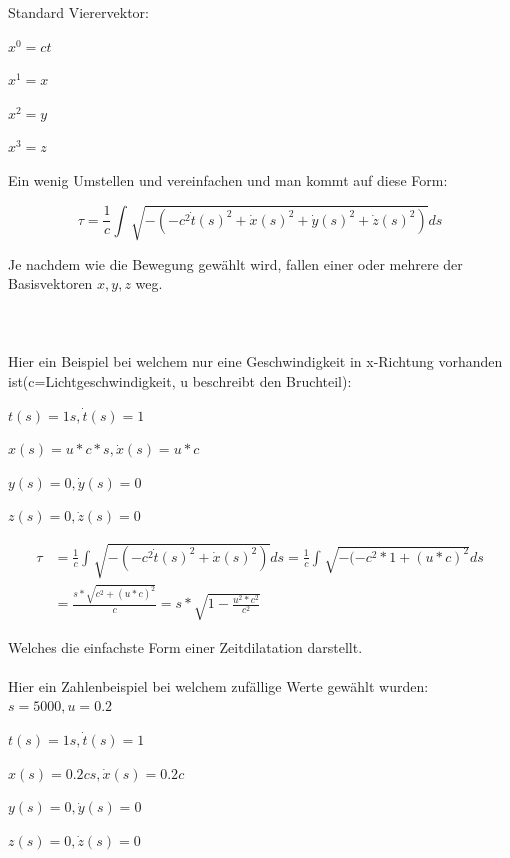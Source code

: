 \begin{refsection}
Standard Vierervektor:

\begin{list}{}{}
    \item \(x^{0}=ct\)
    \item \(x^{1}=x\)
    \item \(x^{2}=y\)
    \item \(x^{3}=z\)
\end{list}

Ein wenig Umstellen und vereinfachen und man kommt auf diese Form:

\begin{equation}
    \tau
    =
    \frac{1}{c}\int_{}^{}\sqrt{-(-c^2\dot{t}(s)^{2}+\dot{x}(s)^{2}+\dot{y}(s)^{2}+\dot{z}(s)^{2})}ds
\end{equation}

Je nachdem wie die Bewegung gew\"ahlt wird, fallen einer oder mehrere der Basisvektoren  $x, y, z$ weg.\\\\\\\\ Hier ein Beispiel bei welchem nur eine Geschwindigkeit in x-Richtung vorhanden ist(c=Lichtgeschwindigkeit, u beschreibt den Bruchteil):

\begin{list}{}{}
    \item $t(s)=1s, \dot{t}(s)=1$
    \item $x(s)=u*c*s, \dot{x}(s)=u*c$
    \item $y(s)=0, \dot{y}(s)=0$
    \item $z(s)=0, \dot{z}(s)=0$
\end{list}

\begin{align*}
    \tau
    &=
    \frac{1}{c}\int_{}^{}\sqrt{-(-c^2\dot{t}(s)^2+\dot{x}(s)^2)}ds 
    =
    \frac{1}{c}\int_{}^{}\sqrt{-(-c^2*1+(u*c)^{2}}ds\\
    &=
    \frac{s*\sqrt{c^2+(u*c)^{2}}}{c} 
    =
    s*\sqrt{1-\frac{u^2*c^2}{c^2}}
\end{align*}

Welches die einfachste Form einer Zeitdilatation darstellt.\\
\\
Hier ein Zahlenbeispiel bei welchem zuf\"allige Werte gew\"ahlt wurden:
$s=5000, u=0.2$ 

\begin{list}{}{}
    \item $t(s)=1s, \dot{t}(s)=1$
    \item $x(s)=0.2cs, \dot{x}(s)=0.2c$
    \item $y(s)=0, \dot{y}(s)=0$
    \item $z(s)=0, \dot{z}(s)=0$
\end{list}


\end{refsection}
